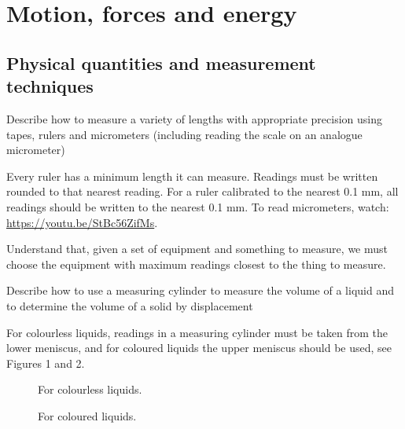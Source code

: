\section{Motion, forces and energy}
\subsection{Physical quantities and measurement techniques}

\begin{firstpoint}
Describe how to measure a variety of lengths with appropriate precision using tapes, rulers and 
micrometers (including reading the scale on an analogue micrometer)
\end{firstpoint}

Every ruler has a minimum length it can measure. Readings must be written rounded to that nearest
reading. For a ruler calibrated to the nearest 0.1 mm, all readings should be written to the 
nearest 0.1 mm.
To read micrometers, watch: \url{https://youtu.be/StBc56ZifMs}.

\smallskip
Understand that, given a set of equipment and something to measure, we must choose the equipment
with maximum readings closest to the thing to measure.

\begin{syllpoint}
Describe how to use a measuring cylinder to measure the volume of a liquid and to determine the volume 
of a solid by displacement
\end{syllpoint}

For colourless liquids, readings in a measuring cylinder must be taken from the lower meniscus,
and for coloured liquids the upper meniscus should be used, see Figures 1 and 2.


\begin{figure}
	\centering


	\caption{For colourless liquids.}
\end{figure}

\begin{figure}
	\centering


	\caption{For coloured liquids.}
\end{figure}

